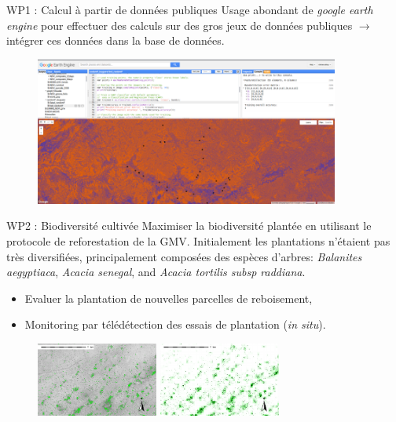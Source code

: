\documentclass[newPxFont]{beamer}
\begin{document}
\begin{frame}[c]{WP1 : Calcul à partir de données publiques}
\vspace{-2em}
Usage abondant de \textit{google earth engine} pour effectuer des calculs sur des gros jeux de données publiques $\rightarrow$ intégrer ces données dans la base de données.
\vspace{-1em}
\begin{figure}
	\centering
	\includegraphics[width = 10cm]{img/ggearthengine}
\end{figure}
\end{frame}

\begin{frame}[c]{WP2 : Biodiversité cultivée}
\vspace{-2em}
Maximiser la biodiversité plantée en utilisant le protocole de reforestation de la GMV. Initialement les plantations n'étaient pas très diversifiées, principalement composées des espèces d'arbres: \textit{Balanites aegyptiaca}, \textit{Acacia senegal}, and \textit{Acacia tortilis subsp raddiana}.
\begin{itemize}
  \item Evaluer la plantation de nouvelles parcelles de reboisement,
  \item Monitoring par télédétection des essais de plantation (\textit{in situ}).
\end{itemize}
\begin{figure}
	\centering
	\includegraphics[width = 4cm]{img/Trees_sup15m2}
  \includegraphics[width = 4cm]{img/GRID_Trees_sup15m2}
\end{figure}
\end{frame}
\end{document}
